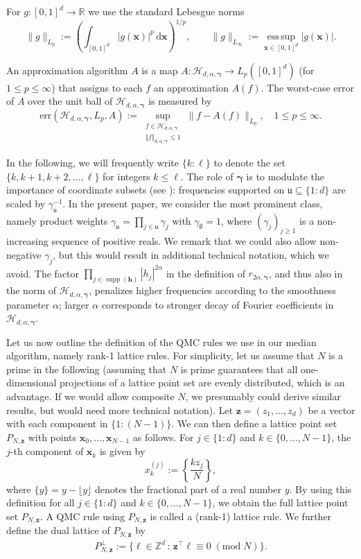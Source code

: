 \documentclass[a4paper,11pt]{article}
\newcommand{\bsh}{\boldsymbol{h}}
\newcommand{\bsl}{\boldsymbol{\ell}}
\newcommand{\bsx}{\boldsymbol{x}}
\newcommand{\bsz}{\boldsymbol{z}}
\newcommand{\bsgamma}{\boldsymbol{\gamma}}
\newcommand{\RR}{\mathbb{R}}
\newcommand{\ZZ}{\mathbb{Z}}
\newcommand{\Hcal}{\mathcal{H}}
\newcommand{\tmod}[1]{{\;(\mathrm{mod}\; #1)}}
\DeclareMathOperator{\supp}{supp}
\newcommand{\abs}[1]{\left\vert#1\right\vert}
\newcommand{\norm}[1]{\left\Vert#1\right\Vert}
\begin{document}
For \(g: [0,1]^d\to \RR \) we use the standard Lebesgue norms
\[
\|g\|_{L_p}:=\left(\int_{[0,1]^d}\abs{g(\bsx)}^{p}\,\mathrm d\bsx\right)^{1/p},
\qquad
\|g\|_{L_\infty}:=\operatorname*{ess\,sup}_{\bsx\in [0,1]^d}\abs{g(\bsx)}.
\]



An approximation algorithm  $A$ is a map $A:\Hcal_{d,\alpha,\bsgamma}\to L_p( [0,1]^d)$ (for $1 \le p \le \infty $) that assigns to each $f$ an approximation 
$A(f)$. The worst-case error of $A$ over the unit ball of 
$\Hcal_{d,\alpha,\bsgamma}$ is measured by
\[
  \mathrm{err}(\Hcal_{d,\alpha,\bsgamma}, L_p, A):= \sup_{\substack{f\in \Hcal_{d,\alpha,\bsgamma}\\ 
  \norm{f}_{d,\alpha,\bsgamma}\le 1}}
  \|f-A(f)\|_{L_p}, \quad 1 \le p \le \infty.
\]

In the following, we will frequently write $\{k{:}\ell\}$ to denote the set $\{k,k+1,k+2,\ldots,\ell\}$ for integers $k\le \ell$.
The role of $\bsgamma$ is to modulate the importance of coordinate subsets (see \cite{SW98}): frequencies supported on $\mathfrak u\subseteq\{1{:}d\}$ are scaled by $\gamma_{\mathfrak u}^{-1}$. In the present paper, we consider the most prominent class, namely product weights $\gamma_{\mathfrak u}=\prod_{j\in\mathfrak u}\gamma_j$ with $\gamma_{\emptyset}=1$, where $(\gamma_j)_{j\ge 1}$ is a non-increasing sequence of positive reals. We remark that we could also allow non-negative $\gamma_j$, but this would result in additional technical notation, which we avoid. The factor $\prod_{j\in\supp(\bsh)} |h_j|^{2\alpha}$ in the definition of $r_{2\alpha,\bsgamma}$, and thus also in the norm of $\Hcal_{d,\alpha,\bsgamma}$, penalizes higher frequencies according to the smoothness parameter $\alpha$; larger $\alpha$ corresponds to stronger decay of Fourier coefficients in $\Hcal_{d,\alpha,\bsgamma}$. 

Let us now outline the definition of the QMC rules we use in our median algorithm, namely rank-1 lattice rules. For simplicity, let us assume that $N$ is a prime in the following (assuming that $N$ is prime guarantees that all one-dimensional projections of a lattice point set are evenly distributed, which is an advantage. If we would allow composite $N$, we presumably could derive similar results, but would need more technical notation). Let $\bsz=(z_1,\ldots,z_d)$ be a 
vector with each component in $\{1{:}(N-1)\}$. We can then define a 
lattice point set $P_{N,\bsz}$ with points $\bsx_0,\ldots,\bsx_{N-1}$ as follows. For $j\in\{1{:}d\}$ and $k\in\{0,\ldots,N-1\}$, the $j$-th component of $\bsx_k$ is given by
\[
x_k^{(j)}:=\left\{\frac{k z_j}{N}\right\},
\]
where $\{y\}=y-\lfloor y \rfloor$ denotes the fractional part of a real number $y$. By using this definition for all $j\in\{1{:}d\}$ and $k\in\{0,\ldots,N-1\}$, we obtain the full lattice point set $P_{N,\bsz}$. A QMC rule using $P_{N,\bsz}$ is called a (rank-1) lattice rule. We further define the dual lattice of $P_{N,\bsz}$ by
\begin{align}\label{eq:def_dual_lattice}
P_{N,\bsz}^\perp := \{\bsl \in \ZZ^d \,:\,  \bsz^\top \bsl \equiv 0 \tmod N\}.
\end{align}
\end{document}
